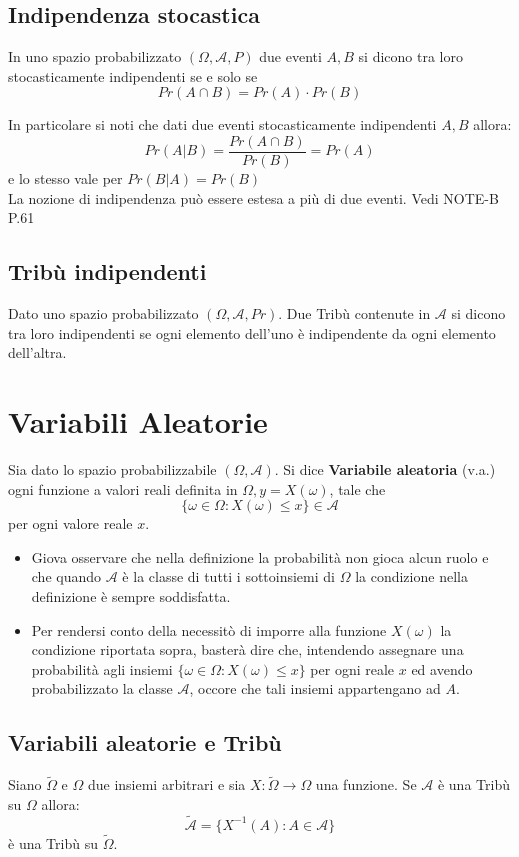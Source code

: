 \documentclass[a4paper]{report}
\begin{document}
  \section{Indipendenza stocastica}
  In uno spazio probabilizzato $(\Omega, \mathcal{A}, P)$ due eventi $A,B$ si dicono tra loro stocasticamente indipendenti se e solo se
  $$Pr(A \cap B) = Pr(A) \cdot Pr(B)$$

  In particolare si noti che dati due eventi stocasticamente indipendenti $A, B$ allora:
  $$Pr(A|B) = \frac{Pr(A \cap B)}{Pr(B)} = Pr(A)$$
  e lo stesso vale per $Pr(B|A) = Pr(B)$\\

  La nozione di indipendenza può essere estesa a più di due eventi. Vedi NOTE-B P.61

  \section{Tribù indipendenti}
  Dato uno spazio probabilizzato $(\Omega, \mathcal{A}, Pr)$. Due Tribù contenute in $\mathcal{A}$ si dicono tra loro indipendenti se ogni elemento dell'uno è indipendente da ogni elemento dell'altra.

  \chapter{Variabili Aleatorie}
  Sia dato lo spazio probabilizzabile $(\Omega, \mathcal{A})$. Si dice \textbf{Variabile aleatoria} (v.a.) ogni funzione a valori reali definita in $\Omega, y = X(\omega)$, tale che
  $$ \{\omega \in \Omega : X(\omega) \leqslant x\} \in \mathcal{A} $$ per ogni valore reale $x$.
  \begin{itemize}
    \item Giova osservare che nella definizione la probabilità non gioca alcun ruolo e che quando $\mathcal{A}$ è la classe di tutti i sottoinsiemi di $\Omega$ la condizione nella definizione è sempre soddisfatta.
    \item Per rendersi conto della necessitò di imporre alla funzione $X(\omega)$ la condizione riportata sopra, basterà dire che, intendendo assegnare una probabilità agli insiemi $\{\omega \in \Omega : X(\omega) \leqslant x\}$ per ogni reale $x$ ed avendo probabilizzato la classe $\mathcal{A}$, occore che tali insiemi appartengano ad $A$.
  \end{itemize}

  \section{Variabili aleatorie e Tribù}
  Siano $\tilde{\Omega}$ e $\Omega$ due insiemi arbitrari e sia $X: \tilde{\Omega} \rightarrow \Omega$ una funzione. Se $\mathcal{A}$ è una Tribù su $\Omega$ allora:
  $$ \tilde{\mathcal{A}} = \{ X^{-1}(A):A \in \mathcal{A} \} $$
  è una Tribù su $\tilde{\Omega}$.
\end{document}
